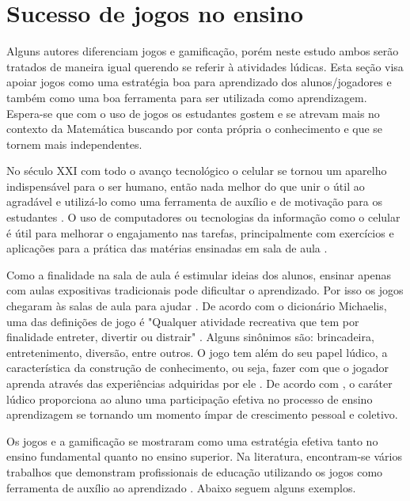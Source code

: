 
\section[Sucesso de jogos no ensino]{Sucesso de jogos no ensino}

Alguns autores diferenciam jogos e gamificação, porém neste estudo ambos serão tratados de maneira igual querendo se referir à atividades lúdicas. Esta seção visa apoiar jogos como uma estratégia boa para aprendizado dos alunos/jogadores e também como uma boa ferramenta para ser utilizada como aprendizagem. Espera-se que com o uso de jogos os estudantes gostem e se atrevam mais no contexto da Matemática buscando por conta própria o conhecimento e que se tornem mais independentes.

No século XXI com todo o avanço tecnológico o celular se tornou um aparelho indispensável para o ser humano, então nada melhor do que unir o útil ao agradável e utilizá-lo como uma ferramenta de auxílio e de motivação para os estudantes \cite{softwaregamificado}. O uso de computadores ou tecnologias da informação como o celular é útil para melhorar o engajamento nas tarefas, principalmente com exercícios e aplicações para a prática das matérias ensinadas em sala de aula \cite{tdahNasEscolas2}.

Como a finalidade na sala de aula é estimular ideias dos alunos, ensinar apenas com aulas expositivas tradicionais pode dificultar o aprendizado. Por isso os jogos chegaram às salas de aula para ajudar \cite[p. 4]{sucessoJogoEngSoft}. De acordo com o dicionário Michaelis, uma das definições de jogo é "Qualquer atividade recreativa que tem por finalidade entreter, divertir ou distrair" \cite{Michaelis}. Alguns sinônimos são: brincadeira, entretenimento, diversão, entre outros. O jogo tem além do seu papel lúdico, a característica da construção de conhecimento, ou seja, fazer com que o jogador aprenda através das experiências adquiridas por ele \cite{jogoPratPedagoc} \cite{appcalculo} \cite{Nunes} \cite{fukusawa}. De acordo com \cite{jogoPratPedagoc}, o caráter lúdico proporciona ao aluno uma participação efetiva no processo de ensino aprendizagem se tornando um momento ímpar de crescimento pessoal e coletivo. 

Os jogos e a gamificação se mostraram como uma estratégia efetiva tanto no ensino fundamental quanto no ensino superior. Na literatura, encontram-se vários trabalhos que demonstram profissionais de educação utilizando os jogos como ferramenta de auxílio ao aprendizado \cite[p. 3]{sucessoJogoEngSoft}. Abaixo seguem alguns exemplos.

